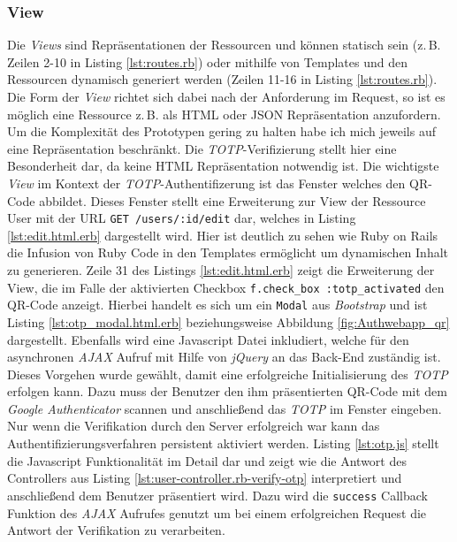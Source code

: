 \documentclass[11pt,a4paper,ngerman]{scrreprt}
\begin{document}
\subsubsection{View}
Die \textit{Views} sind Repräsentationen der Ressourcen und können statisch sein (z.\,B. Zeilen 2-10 in Listing \ref{lst:routes.rb}) oder mithilfe von Templates und den Ressourcen dynamisch generiert werden (Zeilen 11-16 in Listing \ref{lst:routes.rb}). Die Form der \textit{View} richtet sich dabei nach der Anforderung im Request, so ist es möglich eine Ressource z.\,B. als HTML oder JSON Repräsentation anzufordern. Um die Komplexität des Prototypen gering zu halten habe ich mich jeweils auf eine Repräsentation beschränkt. Die \textit{TOTP}-Verifizierung stellt hier eine Besonderheit dar, da keine HTML Repräsentation notwendig ist. Die wichtigste \textit{View} im Kontext der \textit{TOTP}-Authentifizerung ist das Fenster welches den QR-Code abbildet. Dieses Fenster stellt eine Erweiterung zur View der Ressource User mit der URL \texttt{GET /users/:id/edit} dar, welches in Listing \ref{lst:edit.html.erb} dargestellt wird. Hier ist deutlich zu sehen wie Ruby on Rails die Infusion von Ruby Code in den Templates ermöglicht um dynamischen Inhalt zu generieren. Zeile 31 des Listings \ref{lst:edit.html.erb} zeigt die Erweiterung der View, die im Falle der aktivierten Checkbox \texttt{f.check\_box :totp\_activated} den QR-Code anzeigt. Hierbei handelt es sich um ein \texttt{Modal} aus \textit{Bootstrap} und ist Listing \ref{lst:otp_modal.html.erb} beziehungsweise Abbildung \ref{fig:Authwebapp_qr} dargestellt. Ebenfalls wird eine Javascript Datei inkludiert, welche für den asynchronen \textit{AJAX} Aufruf mit Hilfe von \textit{jQuery} an das Back-End zuständig ist. Dieses Vorgehen wurde gewählt, damit eine erfolgreiche Initialisierung des \textit{TOTP} erfolgen kann. Dazu muss der Benutzer den ihm präsentierten QR-Code mit dem \textit{Google Authenticator} scannen und anschließend das \textit{TOTP} im Fenster eingeben. Nur wenn die Verifikation durch den Server erfolgreich war kann das Authentifizierungsverfahren persistent aktiviert werden. Listing \ref{lst:otp.js} stellt die Javascript Funktionalität im Detail dar und zeigt wie die Antwort des Controllers aus Listing \ref{lst:user-controller.rb-verify-otp} interpretiert und anschließend dem Benutzer präsentiert wird. Dazu wird die \texttt{success} Callback Funktion des \textit{AJAX} Aufrufes genutzt um bei einem erfolgreichen Request die Antwort der Verifikation zu verarbeiten.
\end{document}
